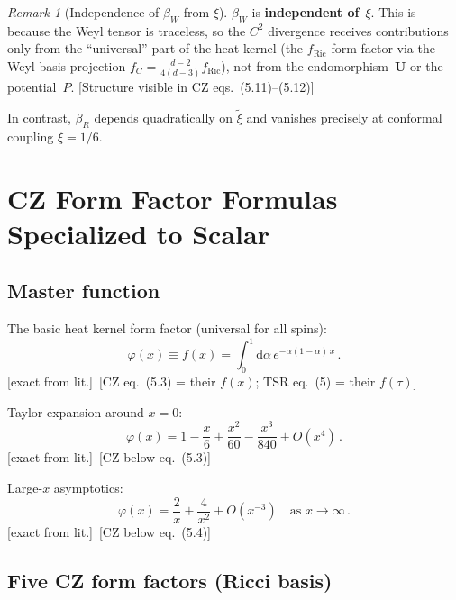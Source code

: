 \documentclass[12pt,a4paper]{article}
\theoremstyle{definition}
\theoremstyle{remark}
\newtheorem{remark}[proposition]{Remark}
\newcommand{\dd}{\mathrm{d}}
\newcommand{\fromlit}[1]{\textcolor{blue!70!black}{\textsf{[#1]}}}
\newcommand{\exactlit}{\textcolor{blue!60!black}{\textsf{[exact from lit.]}}}
\begin{document}
\begin{remark}[Independence of $\beta_W$ from $\xi$]
\label{rem:betaW-xi-independence}
$\beta_W$ is \textbf{independent of}~$\xi$.  This is because the
Weyl tensor is traceless, so the $C^2$ divergence receives
contributions only from the ``universal'' part of the heat kernel
(the $f_{\mathrm{Ric}}$ form factor via the Weyl-basis projection
$f_C = \frac{d-2}{4(d-3)}f_{\mathrm{Ric}}$), not from the
endomorphism~$\mathbf{U}$ or the potential~$P$.
\fromlit{Structure visible in CZ eqs.~(5.11)--(5.12)}

In contrast, $\beta_R$ depends quadratically on $\tilde{\xi}$ and
vanishes precisely at conformal coupling $\xi = 1/6$.
\end{remark}


\section{CZ Form Factor Formulas Specialized to Scalar}
\label{sec:CZ-formulas}

\subsection{Master function}

The basic heat kernel form factor (universal for all spins):
\begin{equation}
  \varphi(x) \equiv f(x) = \int_0^1 \dd\alpha\,e^{-\alpha(1-\alpha)\,x}\,.
  \label{eq:master-function}
\end{equation}
\exactlit\ \fromlit{CZ eq.~(5.3) = their $f(x)$; TSR eq.~(5) = their $f(\tau)$}

\medskip\noindent
Taylor expansion around $x = 0$:
\begin{equation}
  \varphi(x) = 1 - \frac{x}{6} + \frac{x^2}{60} - \frac{x^3}{840} + O(x^4)\,.
  \label{eq:phi-taylor}
\end{equation}
\exactlit\ \fromlit{CZ below eq.~(5.3)}

\medskip\noindent
Large-$x$ asymptotics:
\begin{equation}
  \varphi(x) = \frac{2}{x} + \frac{4}{x^2} + O(x^{-3})
  \quad\text{as } x \to \infty\,.
  \label{eq:phi-asymptotic}
\end{equation}
\exactlit\ \fromlit{CZ below eq.~(5.4)}

\subsection{Five CZ form factors (Ricci basis)}
\label{sec:five-CZ}
\end{document}

